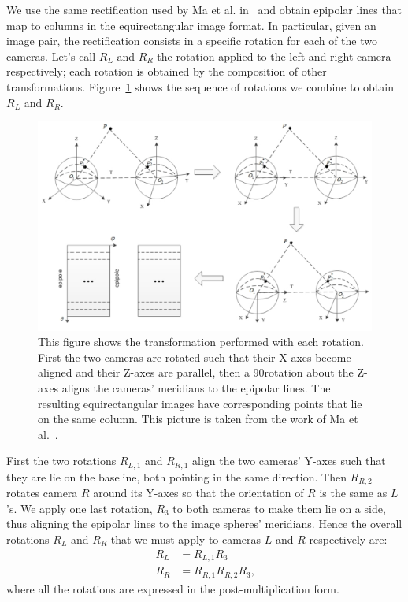 We use the same rectification used by Ma et al. in~\cite{ma20153d} and obtain
epipolar lines that map to columns in the equirectangular image format.
In particular, given an image pair, the rectification consists in a specific
rotation for each of the two cameras. Let's call $R_L$ and $R_R$ the rotation
applied to the left and right camera respectively; each rotation is obtained
by the composition of other transformations. Figure~\ref{fig:rectification} shows
the sequence of rotations we combine to obtain $R_L$ and $R_R$.
%
\begin{figure}
\centering
\includegraphics[width=\linewidth]{img/rectification.png}
\caption{This figure shows the transformation performed with each rotation.
First the two cameras are rotated such that their X-axes become aligned and 
their Z-axes are parallel, then a 90\degree rotation about the Z-axes aligns
the cameras' meridians to the epipolar lines. The resulting equirectangular
images have corresponding points that lie on the same column.
This picture is taken from the work of Ma et al.~\cite{ma20153d}.}
\label{fig:rectification}
\end{figure}
%
First the two rotations $R_{L, 1}$ and $R_{R, 1}$ align the two cameras' Y-axes
such that they are lie on the baseline, both pointing in the same
direction. Then $R_{R, 2}$ rotates camera $R$ around its Y-axes so that
the orientation of $R$
is the same as $L$'s. We apply one last rotation, $R_3$ to both
cameras to make them lie on a side, thus aligning the epipolar lines to the
image spheres' meridians.
Hence the overall rotations $R_L$ and $R_R$ that we must apply to cameras $L$ and $R$
respectively are:
\begin{align}
	R_L &= R_{L, 1}R_3 \\
	R_R &= R_{R, 1}R_{R, 2}R_3	\text{,}
\end{align}
\noindent where all the rotations are expressed in the post-multiplication form.

